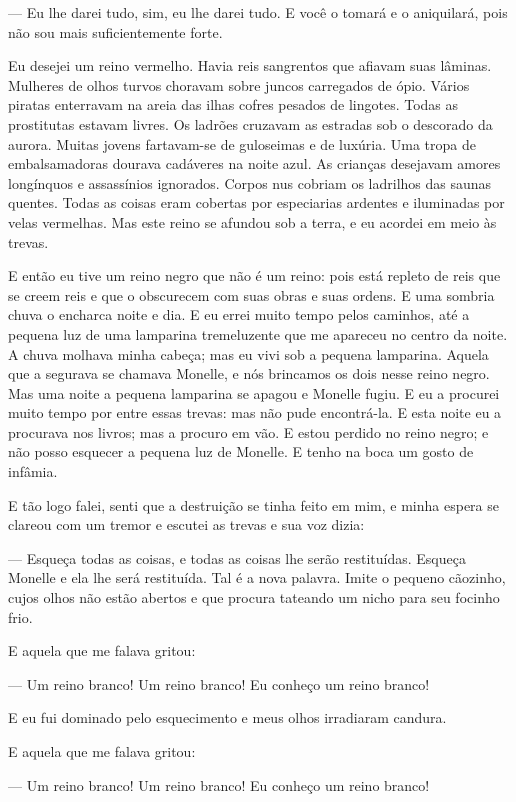 --- Eu lhe darei tudo, sim, eu lhe darei tudo. E você o tomará e o
aniquilará, pois não sou mais suficientemente forte.

Eu desejei um reino vermelho. Havia reis sangrentos que afiavam suas
lâminas. Mulheres de olhos turvos choravam sobre juncos carregados de ópio.
Vários piratas enterravam na areia das ilhas cofres pesados de lingotes.
Todas as prostitutas estavam livres. Os ladrões cruzavam as estradas sob o
descorado da aurora. Muitas jovens fartavam-se de guloseimas e de luxúria.
Uma tropa de embalsamadoras dourava cadáveres na noite azul. As crianças
desejavam amores longínquos e assassínios ignorados. Corpos nus cobriam os
ladrilhos das saunas quentes. Todas as coisas eram cobertas por
especiarias ardentes e iluminadas por velas vermelhas. Mas este reino se
afundou sob a terra, e eu acordei em meio às trevas.

E então eu tive um reino negro que não é um reino: pois está repleto de
reis que se creem reis e que o obscurecem com suas obras e suas ordens. E
uma sombria chuva o encharca noite e dia. E eu errei muito tempo pelos
caminhos, até a pequena luz de uma lamparina tremeluzente que me apareceu no
centro da noite. A chuva molhava minha cabeça; mas eu vivi sob a pequena
lamparina. Aquela que a segurava se chamava Monelle, e nós brincamos os dois
nesse reino negro. Mas uma noite a pequena lamparina se apagou e Monelle
fugiu. E eu a procurei muito tempo por entre essas trevas: mas não pude
encontrá-la. E esta noite eu a procurava nos livros; mas a procuro em vão.
E estou perdido no reino negro; e não posso esquecer a pequena luz de
Monelle. E tenho na boca um gosto de infâmia.

E tão logo falei, senti que a destruição se tinha feito em mim, e minha
espera se clareou com um tremor e escutei as trevas e sua voz dizia:

--- Esqueça todas as coisas, e todas as coisas lhe serão restituídas.
Esqueça Monelle e ela lhe será restituída. Tal é a nova palavra. Imite o
pequeno cãozinho, cujos olhos não estão abertos e que procura tateando um
nicho para seu focinho frio.

E aquela que me falava gritou:

--- Um reino branco! Um reino branco! Eu conheço um reino branco!

E eu fui dominado pelo esquecimento e meus olhos irradiaram candura.

E aquela que me falava gritou:

--- Um reino branco! Um reino branco! Eu conheço um reino branco!

